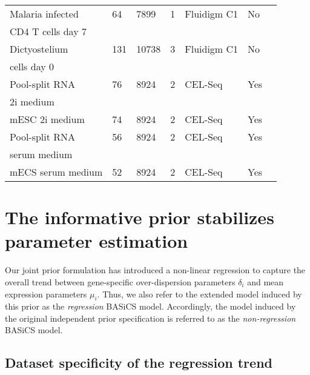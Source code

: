 \begin{table}[hb	]
\begin{tabular}{lllllll}
Malaria infected  & 64       & 7899     & 1          & Fluidigm C1       & No   & \citep{Lonnberg2017}         \\
CD4\plus{}  T cells day 7    &   & &  &  &  &   \\
\midrule

Dictyostelium             & 131      & 10738    & 3          & Fluidigm C1       & No   & \citep{Antolovic2017}        \\
cells day 0  &  &   &   &  & & \\
\midrule

Pool-split RNA                 & 76       & 8924     & 2          & CEL-Seq           & Yes  & \citep{Grun2014}            \\
2i medium  &  &  & &  &  & \\
\midrule

mESC 2i medium    & 74       & 8924     & 2          & CEL-Seq           & Yes  & \citep{Grun2014} \\
\midrule

Pool-split RNA             & 56       & 8924     & 2          & CEL-Seq           & Yes  & \citep{Grun2014}            \\
serum medium &  &      &         &   &   &  \\
\midrule

mECS serum medium & 52       & 8924     & 2          & CEL-Seq           & Yes  & \citep{Grun2014} \\
\bottomrule       
\end{tabular}
\end{table}


\section{The informative prior stabilizes parameter estimation}
\label{sec2:stabilization}

Our joint prior formulation has introduced a non-linear regression to capture the overall trend between gene-specific over-dispersion parameters $\delta_i$ and mean expression parameters $\mu_i$. Thus, we also refer to the extended model induced by this prior as the \textit{regression} BASiCS model. Accordingly, the model induced by the original independent prior specification \citep{Vallejos2016} is referred to as the \textit{non-regression} BASiCS model.\\ 

\subsection{Dataset specificity of the regression trend}

